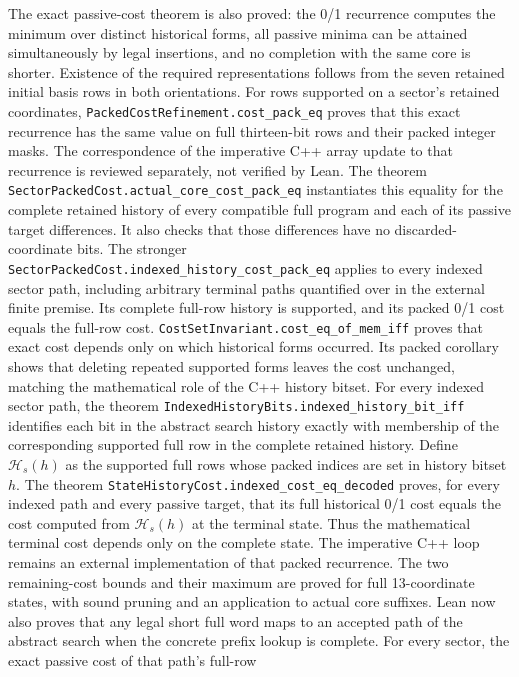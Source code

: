 \documentclass[11pt]{article}
\begin{document}
The exact passive-cost theorem is also proved: the 0/1 recurrence computes
the minimum over distinct historical forms, all passive minima can be
attained simultaneously by legal insertions, and no completion with the
same core is shorter. Existence of the required representations follows
from the seven retained initial basis rows in both orientations.
For rows supported on a sector's retained coordinates,
\texttt{PackedCostRefinement.cost\_pack\_eq} proves that this exact
recurrence has the same value on full thirteen-bit rows and their packed
integer masks. The correspondence of the imperative C++ array update to
that recurrence is reviewed separately, not verified by Lean.
The theorem \texttt{SectorPackedCost.actual\_core\_cost\_pack\_eq}
instantiates this equality for the complete retained history of every
compatible full program and each of its passive target differences.
It also checks that those differences have no discarded-coordinate bits.
The stronger \texttt{SectorPackedCost.indexed\_history\_cost\_pack\_eq}
applies to every indexed sector path, including arbitrary terminal paths
quantified over in the external finite premise. Its complete full-row
history is supported, and its packed 0/1 cost equals the full-row cost.
\texttt{CostSetInvariant.cost\_eq\_of\_mem\_iff} proves that exact cost
depends only on which historical forms occurred. Its packed corollary
shows that deleting repeated supported forms leaves the cost unchanged,
matching the mathematical role of the C++ history bitset.
For every indexed sector path, the theorem
\texttt{IndexedHistoryBits.indexed\_history\_bit\_iff} identifies each
bit in the abstract search history exactly with membership of the
corresponding supported full row in the complete retained history.
Define $\mathcal H_s(h)$ as the supported full rows whose packed indices
are set in history bitset $h$. The theorem
\texttt{StateHistoryCost.indexed\_cost\_eq\_decoded} proves, for every
indexed path and every passive target, that its full historical 0/1 cost
equals the cost computed from $\mathcal H_s(h)$ at the terminal state.
Thus the mathematical terminal cost depends only on the complete state.
The imperative C++ loop remains an external implementation of that
packed recurrence.
The two remaining-cost bounds and their maximum are proved for full
13-coordinate states, with sound pruning and an application to actual
core suffixes. Lean now also proves that any legal short full word maps to
an accepted path of the abstract search when the concrete prefix lookup is
complete. For every sector, the exact passive cost of that path's full-row
\end{document}

